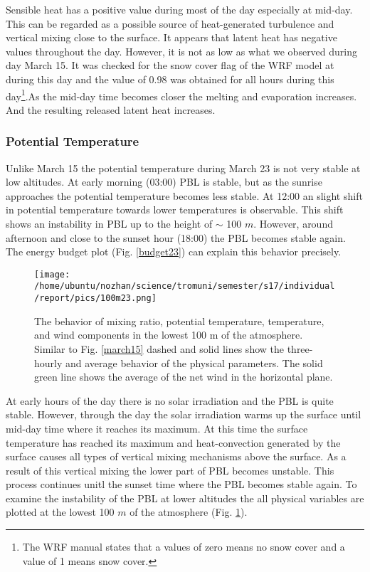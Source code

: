 \documentclass[a4paper,12pt]{article}
\numberwithin{equation}{section} %
\begin{document}
Sensible heat has a positive value during most of the day especially at mid-day. This can be regarded as a possible source of heat-generated turbulence and vertical mixing close to the surface. It appears that latent heat has negative values throughout the day. However, it is not as low as what we observed during day March 15. It was checked for the snow cover flag of the WRF model at during this day and the value of 0.98 was obtained for all hours during this day\footnote{The WRF manual states that a values of zero means no snow cover and a value of 1 means snow cover.}.As the mid-day time becomes closer the melting and evaporation increases. And the resulting released latent heat increases.

\subsubsection{Potential Temperature}

Unlike March 15 the potential temperature during March 23 is not very stable at low altitudes. At early morning (03:00) PBL is stable, but as the sunrise approaches the potential temperature becomes less stable. At 12:00 an slight shift in potential temperature towards lower temperatures is observable. This shift shows an instability in PBL up to the height of $\sim$ 100 $m$. However, around afternoon and close to the sunset hour (18:00) the PBL becomes stable again. The energy budget plot (Fig. \ref{budget23}) can explain this behavior precisely. 

\begin{figure}[bhp]
\texttt{[image: /home/ubuntu/nozhan/science/tromuni/semester/s17/individual/report/pics/100m23.png]}
\caption{The behavior of mixing ratio, potential temperature, temperature, and wind components in the lowest 100 m of the atmosphere. Similar to Fig. \ref{march15} dashed and solid lines show the three-hourly and average behavior of the physical parameters. The solid green line shows the average of the net wind in the horizontal plane.}
\label{100m23}
\end{figure}

At early hours of the day there is no solar irradiation and the PBL is quite stable. However, through the day the solar irradiation warms up the surface until mid-day time where it reaches its maximum. At this time the surface temperature has reached its maximum and heat-convection generated by the surface causes all types of vertical mixing mechanisms above the surface. As a result of this vertical mixing the lower part of PBL becomes unstable. This process continues unitl the sunset time where the PBL becomes stable again. To examine the instability of the PBL at lower altitudes the all physical variables are plotted at the lowest 100 $m$ of the atmosphere (Fig. \ref{100m23}).
\end{document}

